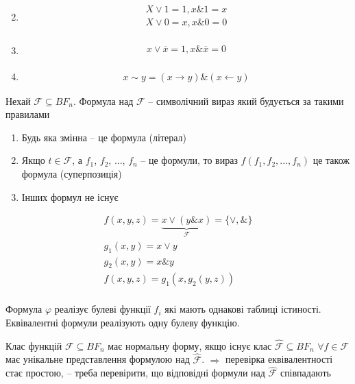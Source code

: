 \begin{remark}
\begin{multicols}{2}
\begin{enumerate}
\begin{gather*}
            \end{gather*}
            \item \begin{gather*}
                X \vee 1 = 1, x \& 1 = x \\
                X \vee 0 = x, x \& 0 = 0 \\
            \end{gather*}
            \item \begin{gather*}
                x \vee \overline{x} = 1, x \& \overline{x} = 0\\
            \end{gather*}
            \item \begin{gather*}
                x \sim y = (x \rightarrow y) \& (x \leftarrow y)
            \end{gather*}
        \end{enumerate}
    \end{multicols}
\end{remark}


Нехай $\mathcal{F} \subseteq BF_n$.
Формула над $\mathcal{F}$ -- символічний вираз який  будується
за такими правилами
\begin{enumerate}
    \item Будь яка змінна -- це формула (літерал)
    \item Якщо $t \in \mathcal{F}$, а $f_1$, $f_2$, ..., $f_n$ -- це формули, то вираз $f(f_1, f_2, ..., f_n)$ це також формула (суперпозиція)
    \item Інших формул не існує
\end{enumerate}

\begin{example}
    \begin{gather*}
        f(x, y, z) = \underbrace{x \vee (y \& x)}_{\mathcal{F}} = \{\vee, \&\} \\
        g_1(x, y) = x \vee y \\
        g_2(x, y) = x \& y \\
        f(x, y, z) = g_1(x, g_2(y, z)) \\
    \end{gather*}
\end{example}

Формула $\varphi$ реалізує булеві функції $f_i$ які мають однакові таблиці істиності.
Еквівалентні формули реалізують одну булеву функцію.

Клас функцій $\mathcal{F} \subseteq BF_n$ має нормальну форму, якщо
існує клас $\hat{\mathcal{F}} \subseteq BF_n$ $\forall f \in \mathcal{F}$ має унікальне представлення формулою над $\hat{\mathcal{F}}$.
$\Rightarrow$ перевірка еквівалентності стає простою,
-- треба перевірити, що відповідні формули над $\hat{\mathcal{F}}$
співпадають

